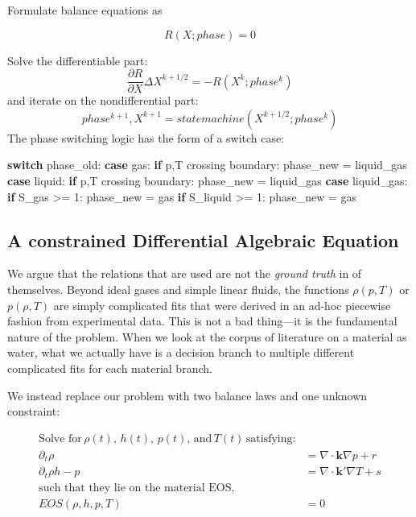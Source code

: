 \documentclass[]{article}
\newenvironment{Shaded}{}{}
\newcommand{\ControlFlowTok}[1]{\textcolor[rgb]{0.00,0.44,0.13}{\textbf{#1}}}
\newcommand{\DecValTok}[1]{\textcolor[rgb]{0.25,0.63,0.44}{#1}}
\newcommand{\NormalTok}[1]{#1}
\begin{document}
Formulate balance equations as

\[R(X ; phase) = 0\]

Solve the differentiable part:
\[\frac{\partial R}{\partial X}\Delta X^{k+1/2} = -R(X^k ; phase^k)\]
and iterate on the nondifferential part:
\[phase^{k+1},X^{k+1} = statemachine(X^{k+1/2} ; phase^k)\]
The phase switching logic has the form of a switch case:

\begin{Shaded}
\begin{Highlighting}[]
\ControlFlowTok{switch}\NormalTok{ phase_old:}
  \ControlFlowTok{case}\NormalTok{ gas:}
    \ControlFlowTok{if}\NormalTok{ p,T crossing boundary:}
\NormalTok{      phase_new = liquid_gas}
  \ControlFlowTok{case}\NormalTok{ liquid:}
    \ControlFlowTok{if}\NormalTok{ p,T crossing boundary:}
\NormalTok{      phase_new = liquid_gas}
  \ControlFlowTok{case}\NormalTok{ liquid_gas:}
    \ControlFlowTok{if}\NormalTok{ S_gas >= }\DecValTok{1}\NormalTok{:}
\NormalTok{      phase_new = gas}
    \ControlFlowTok{if}\NormalTok{ S_liquid >= }\DecValTok{1}\NormalTok{:}
\NormalTok{      phase_new = gas}
\end{Highlighting}
\end{Shaded}

\hypertarget{header-n3262}{%
\subsection{A constrained Differential Algebraic
Equation}\label{header-n3262}}

We argue that the relations that are used are not the \emph{ground
truth} in of themselves. Beyond ideal gases and simple linear fluids,
the functions \(\rho(p,T)\) or \(p(\rho,T)\) are simply complicated fits
that were derived in an ad-hoc piecewise fashion from experimental data.
This is not a bad thing---it is the fundamental nature of the problem.
When we look at the corpus of literature on a material as water, what we
actually have is a decision branch to multiple different complicated
fits for each material branch.

We instead replace our problem with two balance laws and one unknown
constraint:

\begin{align}
\text{Solve for}\, \rho(t), \, h(t), \, p(t),\, \text{and}\, T(t)\, \text{satisfying:}\\
\partial_t \rho & = \nabla \cdot \mathbf{k}\nabla p + r\\
\partial_t \rho h - p & = \nabla \cdot \mathbf{k'}\nabla T + s\\
\text{such that they lie on the material EOS,}\\
EOS(\rho,h,p,T) & = 0
\end{align}
\end{document}
